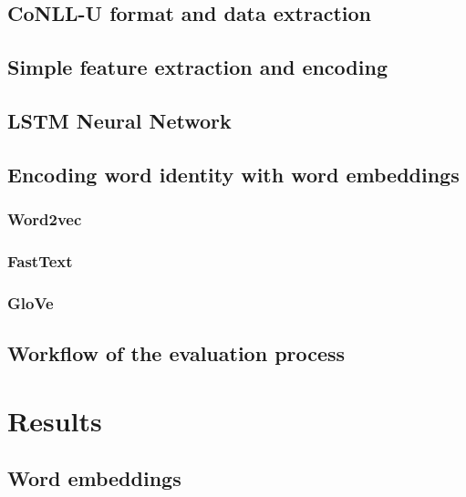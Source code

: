 \documentclass[12pt]{article}
\begin{document}
\subsection{CoNLL-U format and data extraction}
\label{conllu_imp}


\subsection{Simple feature extraction and encoding}
\label{feat_imp}


\subsection{LSTM Neural Network}
\label{lstm_imp}


\subsection{Encoding word identity with word embeddings}
\subsubsection{Word2vec}
\label{word2vec_imp}


\subsubsection{FastText}
\label{fasttext_imp}


\subsubsection{GloVe}
\label{glove_imp}


\subsection{Workflow of the evaluation process}
\label{workflow_imp}



\section{Results}

\subsection{Word embeddings}
\label{res_we}

\end{document}
